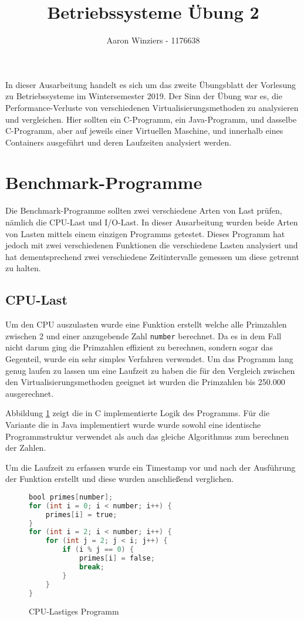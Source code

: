 \documentclass[10pt,a4paper]{article}
\author{Aaron Winziers - 1176638}
\title{Betriebssysteme Übung 2}
\begin{document}
	\maketitle
	
	In dieser Ausarbeitung handelt es sich um das zweite Übungsblatt der Vorlesung zu Betriebssysteme im Wintersemester 2019. Der Sinn der Übung war es, die Performance-Verluste von verschiedenen Virtualisierungsmethoden zu analysieren und vergleichen. Hier sollten ein C-Programm, ein Java-Programm, und dasselbe C-Programm, aber auf jeweils einer Virtuellen Maschine, und innerhalb eines Containers ausgeführt und deren Laufzeiten analysiert werden.
	
	\section{Benchmark-Programme}
	
	Die Benchmark-Programme sollten zwei verschiedene Arten von Last prüfen, nämlich die CPU-Last und I/O-Last. In dieser Ausarbeitung wurden beide Arten von Lasten mittels einem einzigen Programms getestet. Dieses Programm hat jedoch mit zwei verschiedenen Funktionen die verschiedene Lasten analysiert und hat dementsprechend zwei verschiedene Zeitintervalle gemessen um diese getrennt zu halten.
	
	\subsection{CPU-Last}
	
	Um den CPU auszulasten wurde eine Funktion erstellt welche alle Primzahlen zwischen 2 und einer anzugebende Zahl \texttt{number} berechnet. Da es in dem Fall nicht darum ging die Primzahlen effizient zu berechnen, sondern sogar das Gegenteil, wurde ein sehr simples Verfahren verwendet. Um das Programm lang genug laufen zu lassen um eine Laufzeit zu haben die für den Vergleich zwischen den Virtualisierungsmethoden geeignet ist wurden die Primzahlen bis 250.000 ausgerechnet.
	
	Abbildung \ref{cpu} zeigt die in C implementierte Logik des Programms. Für die Variante die in Java implementiert wurde wurde sowohl eine identische Programmstruktur verwendet als auch das gleiche Algorithmus zum berechnen der Zahlen.
	
	Um die Laufzeit zu erfassen wurde ein Timestamp vor und nach der Ausführung der Funktion erstellt und diese wurden anschließend verglichen.
	
	\begin{figure}[h]
		\begin{lstlisting}[language=C, tabsize=3]
bool primes[number];
for (int i = 0; i < number; i++) {
	primes[i] = true;
}
for (int i = 2; i < number; i++) {
	for (int j = 2; j < i; j++) {
		if (i % j == 0) {
			primes[i] = false;
			break;
		}
	}
}
		\end{lstlisting}
		\caption{CPU-Lastiges Programm}
		\label{cpu}
	\end{figure}	
\newpage
	
\end{document}
